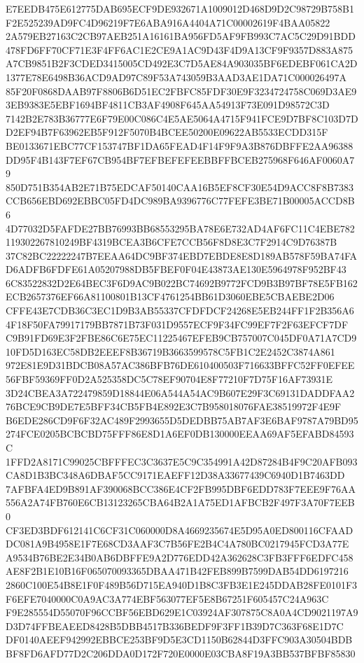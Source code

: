 \documentclass[UTF8,fontset=fandol,zihao=-4,a4paper]{ctexart}
\begin{document}
{{E7EEDB475E612775DAB695ECF9DE932671A1009012D468D9D2C98729B758B1F2E525239AD9FC4D96219F7E6ABA916A4404A71C00002619F4BAA05822
2A579EB27163C2CB97AEB251A16161BA956FD5AF9FB993C7AC5C29D91BDD478FD6FF70CF71E3F4FF6AC1E2CE9A1AC9D43F4D9A13CF9F9357D883A875
A7CB9851B2F3CDED3415005CD492E3C7D5AE84A903035BF6EDEBF061CA2D1377E78E6498B36ACD9AD97C89F53A743059B3AAD3AE1DA71C000026497A
85F20F0868DAAB97F8806B6D51EC2FBFC85FDF30E9F3234724758C069D3AE93EB9383E5EBF1694BF4811CB3AF4908F645AA54913F73E091D98572C3D
7142B2E783B36777E6F79E00C086C4E5AE5064A4715F941FCE9D7BF8C103D7DD2EF94B7F63962EB5F912F5070B4BCEE50200E09622AB5533ECDD315F
BE0133671EBC77CF153747BF1DA65FEAD4F14F9F9A3B876DBFFE2AA96388DD95F4B143F7EF67CB954BF7EFBEFEFEEBBFFBCEB275968F646AF0060A79
850D751B354AB2E71B75EDCAF50140CAA16B5EF8CF30E54D9ACC8F8B7383CCB656EBD692EBBC05FD4DC989BA9396776C77FEFE3BE71B00005ACCD8B6
4D77032D5FAFDE27BB76993BB68553295BA78E6E732AD4AF6FC11C4EBE782119302267810249BF4319BCEA3B6CFE7CCB56F8D8E3C7F2914C9D76387B
37C82BC22222247B7EEAA64DC9BF374EBD7EBDE8E8D189AB578F59BA74FAD6ADFB6FDFE61A05207988DB5FBEF0F04E43873AE130E5964978F952BF43
6C83522832D2E64BEC3F6D9AC9B022BC74692B9772FCD9B3B97BF78E5FB162ECB2657376EF66A81100801B13CF4761254BB61D3060EBE5CBAEBE2D06
CFFE43E7CDB36C3EC1D9B3AB55337CFDFDCF24268E5EB244FF1F2B356A64F18F50FA79917179BB7871B73F031D9557ECF9F34FC99EF7F2F63EFCF7DF
C9B91FD69E3F2FBE86C6E75EC11225467EFEB9CB757007C045DF0A71A7CD910FD5D163EC58DB2EEEF8B36719B3663599578C5FB1C2E2452C3874A861
972E81E9D31BDCB08A57AC386BFB76DE610400503F716633BFFC52FF0EFEE56FBF59369FF0D2A525358DC5C78EF90704E8F77210F7D75F16AF73931E
3D24CBEA3A722479859D18844E06A544A54AC9B607E29F3C69131DADDFAA276BCE9CB9DE7E5BFF34CB5FB4E892E3C7B958018076FAE38519972F4E9F
B6EDE286CD9F6F32AC489F2993655D5DEDBB75AB7AF3E6BAF9787A79BD95274FCE0205BCBCBD75FFF86E8D1A6EF0DB130000EEAA69AF5EFABD84593C
1FFD2A8171C99025CBFFFEC3C3637E5C9C354991A42D87284B4F9C20AFB093CA8D1B3BC348A6DBAF5CC9171EAEFF12D38A33677439C6940D1B7463DD
7AFBFA4ED9B891AF390068BCC386E4CF2FB995DBF6EDD783F7EEE9F76AA556A2A74FB760E6CB13123265CBA64B2A1A75ED1AFBCB2F497F3A70F7EEB0
CF3ED3BDF612141C6CF31C060000D8A4669235674E5D95A0ED800116CFAADDC081A9B4958E1F7E68CD3AAF3C7B56FE2B4C4A780BC0217945FCD3A77E
A9534B76BE2E34B0AB6DBFFE9A2D776EDD42A362628C3FB3FFF6EDFC458AE8F2B1E10B16F065070093365DBAA471B42FEB899B7599DAB54DD6197216
2860C100E54B8E1F0F489B56D715EA940D1B8C3FB3E1E245DDAB28FE0101F3F6EFE7040000C0A9AC3A774EBF563077EF5E8B67251F605457C24A963C
F9E285554D55070F96CCBF56EBD629E1C03924AF307875C8A0A4CD9021197A9D3D74FFBEAEED8428B5DBB4517B336BEDF9F3FF1B39D7C363F68E1D7C
DF0140AEEF942992EBBCE253BF9D5E3CD1150B62844D3FFC903A30504BDBBF8FD6AFD77D2C206DDA0D172F720E0000E03CBA8F19A3BB537BFBF85830
}}
\end{document}

